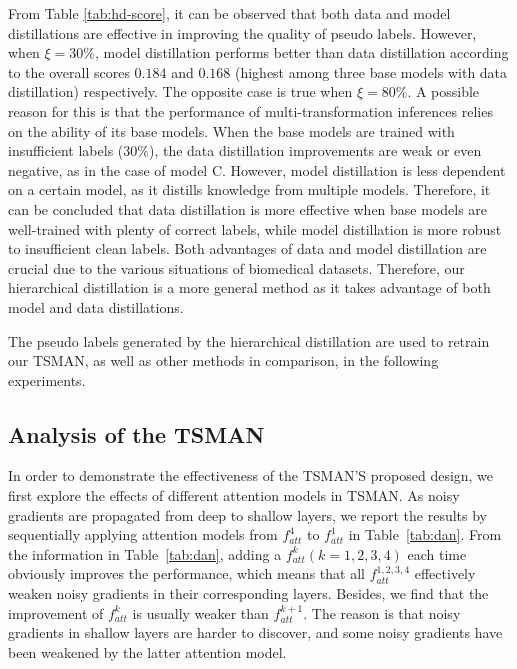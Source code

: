 \documentclass[letterpaper]{article} %
\begin{document}
From Table \ref{tab:hd-score}, it can be observed that both data and model distillations are effective in improving the quality of pseudo labels.
However, when $\xi=30\%$, model distillation performs better than data distillation according to the overall scores $0.184$ and $0.168$ (highest among three base models with data distillation) respectively. The opposite case is true when $\xi=80\%$.
A possible reason for this is that the performance of multi-transformation inferences relies on the ability of its base models.
When the base models are trained with insufficient labels ($30\%$), the data distillation improvements are weak or even negative, as in the case of model C.
However, model distillation is less dependent on a certain model, as it distills knowledge from multiple models.
Therefore, it can be concluded that data distillation is more effective when base models are well-trained with plenty of correct labels, while model distillation is more robust to insufficient clean labels.
Both advantages of data and model distillation are crucial due to the various situations of biomedical datasets.
Therefore, our hierarchical distillation is a more general method as it takes advantage of both model and data distillations.

The pseudo labels generated by the hierarchical distillation are used to retrain our TSMAN, as well as other methods in comparison, in the following experiments.

\subsection{Analysis of the TSMAN}
In order to demonstrate the effectiveness of the TSMAN'S proposed design, we first explore the effects of different attention models in TSMAN.
As noisy gradients are propagated from deep to shallow layers, we report the results by 
sequentially applying attention models from $f_{att}^{4}$ to $f_{att}^{1}$ in Table~\ref{tab:dan}. 
From the information in Table~\ref{tab:dan}, adding a $f_{att}^{k}$$(k=1,2,3,4)$ each time obviously improves the performance, which means that all $f_{att}^{1,2,3,4}$ effectively weaken noisy gradients in their corresponding layers. 
Besides, we find that the improvement of $f_{att}^k$ is usually weaker than $f_{att}^{k+1}$.
The reason is that noisy gradients in shallow layers are harder to discover, and some noisy gradients have been weakened by the latter attention model.
\end{document}
